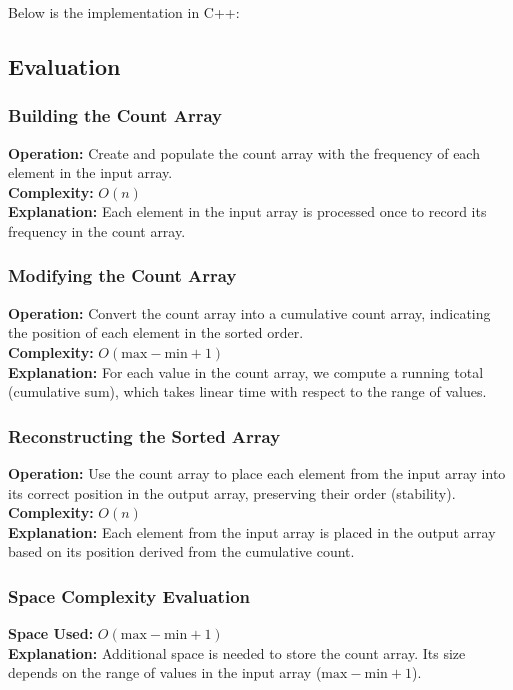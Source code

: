 \begin{minipage}{\linewidth}
    Below is the implementation in C++:
    
\end{minipage}

\subsection{Evaluation}
\subsubsection{Building the Count Array}
\textbf{Operation:} Create and populate the count array with the frequency of each element in the input array. \\
\textbf{Complexity:} \(O(n)\) \\
\textbf{Explanation:} Each element in the input array is processed once to record its frequency in the count array.

\subsubsection{Modifying the Count Array}
\textbf{Operation:} Convert the count array into a cumulative count array, indicating the position of each element in the sorted order. \\
\textbf{Complexity:} \(O(\text{max} - \text{min} + 1)\) \\
\textbf{Explanation:} For each value in the count array, we compute a running total (cumulative sum), which takes linear time with respect to the range of values.

\subsubsection{Reconstructing the Sorted Array}
\textbf{Operation:} Use the count array to place each element from the input array into its correct position in the output array, preserving their order (stability). \\
\textbf{Complexity:} \(O(n)\) \\
\textbf{Explanation:} Each element from the input array is placed in the output array based on its position derived from the cumulative count.

\subsubsection{Space Complexity Evaluation}
\textbf{Space Used:} \(O(\text{max} - \text{min} + 1)\) \\
\textbf{Explanation:} Additional space is needed to store the count array. Its size depends on the range of values in the input array (\(\text{max} - \text{min} + 1\)).


